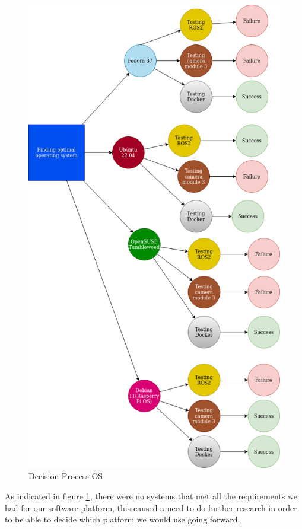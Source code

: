 \begin{figure}[H]
    \centering
    \includegraphics[scale=0.5]{fig/decision_os.png}
    \caption{Decision Process OS}
    \label{fig:osarch}
\end{figure}

\clearpage

As indicated in figure \ref{fig:osarch}, there were no systems that met all the requirements we had for our software platform, this caused a need to do further research in order to be able to decide which platform we would use going forward. \\

